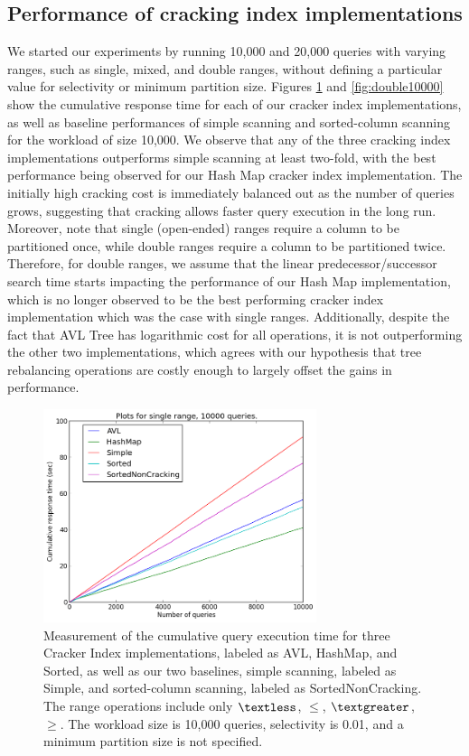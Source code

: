 \subsection{Performance of cracking index implementations}
We started our experiments by running 10,000 and 20,000 queries with varying ranges, such as single, mixed, and double ranges, without defining a particular value for selectivity or minimum partition size. Figures \ref{fig:single10000} and \ref{fig:double10000} show the cumulative response time for each of our cracker index implementations, as well as baseline performances of simple scanning and sorted-column scanning for the workload of size 10,000. We observe that any of the three cracking index implementations outperforms simple scanning at least two-fold, with the best performance being observed for our Hash Map cracker index implementation. The initially high cracking cost is immediately balanced out as the number of queries grows, suggesting that cracking allows faster query execution in the long run. Moreover, note that single (open-ended) ranges require a column to be partitioned once, while double ranges require a column to be partitioned twice. Therefore, for double ranges, we assume that the linear predecessor/successor search time starts impacting the performance of our Hash Map implementation, which is no longer observed to be the best performing cracker index implementation which was the case with single ranges. Additionally, despite the fact that AVL Tree has logarithmic cost for all operations, it is not outperforming the other two implementations, which agrees with our hypothesis that tree rebalancing operations are costly enough to largely offset the gains in performance.

\begin{figure}[h]
\centering
\includegraphics[width=8cm]{figures/single10000}
\caption{Measurement of the cumulative query execution time for three Cracker Index implementations, labeled as AVL, HashMap, and Sorted, as well as our two baselines, simple scanning, labeled as Simple, and sorted-column scanning, labeled as SortedNonCracking. The range operations include only $\textless$, $\leq$, $\textgreater$, $\geq$. The workload size is 10,000 queries, selectivity is 0.01, and a minimum partition size is not specified.}
\label{fig:single10000}
\end{figure}

